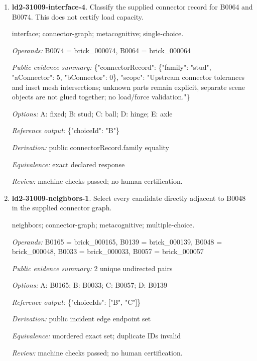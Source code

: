 \begin{enumerate}
\par{\small interface; connector-graph; metacognitive; single-choice.\par\textit{Operands:} B0259 = brick\_000259, B0258 = brick\_000258\par\textit{Public evidence summary:} \{"connectorRecord": \{"family": "hinge", "aConnector": 1, "bConnector": 2\}, "scope": "Upstream connector tolerances and inset mesh intersections; unknown parts remain explicit, separate scene objects are not glued together; no load/force validation."\}\par\textit{Options:} A: ball; B: fixed; C: axle; D: hinge; E: stud\par\textit{Reference output:} \{"choiceId": "D"\}\par\textit{Derivation:} public connectorRecord.family equality\par\textit{Equivalence:} exact declared response\par\textit{Review:} machine checks passed; no human certification.}
\item \textbf{ld2-31009-interface-4}. Classify the supplied connector record for B0064 and B0074. This does not certify load capacity.
\par{\small interface; connector-graph; metacognitive; single-choice.\par\textit{Operands:} B0074 = brick\_000074, B0064 = brick\_000064\par\textit{Public evidence summary:} \{"connectorRecord": \{"family": "stud", "aConnector": 5, "bConnector": 0\}, "scope": "Upstream connector tolerances and inset mesh intersections; unknown parts remain explicit, separate scene objects are not glued together; no load/force validation."\}\par\textit{Options:} A: fixed; B: stud; C: ball; D: hinge; E: axle\par\textit{Reference output:} \{"choiceId": "B"\}\par\textit{Derivation:} public connectorRecord.family equality\par\textit{Equivalence:} exact declared response\par\textit{Review:} machine checks passed; no human certification.}
\item \textbf{ld2-31009-neighbors-1}. Select every candidate directly adjacent to B0048 in the supplied connector graph.
\par{\small neighbors; connector-graph; metacognitive; multiple-choice.\par\textit{Operands:} B0165 = brick\_000165, B0139 = brick\_000139, B0048 = brick\_000048, B0033 = brick\_000033, B0057 = brick\_000057\par\textit{Public evidence summary:} 2 unique undirected pairs\par\textit{Options:} A: B0165; B: B0033; C: B0057; D: B0139\par\textit{Reference output:} \{"choiceIds": ["B", "C"]\}\par\textit{Derivation:} public incident edge endpoint set\par\textit{Equivalence:} unordered exact set; duplicate IDs invalid\par\textit{Review:} machine checks passed; no human certification.}

\end{enumerate}
